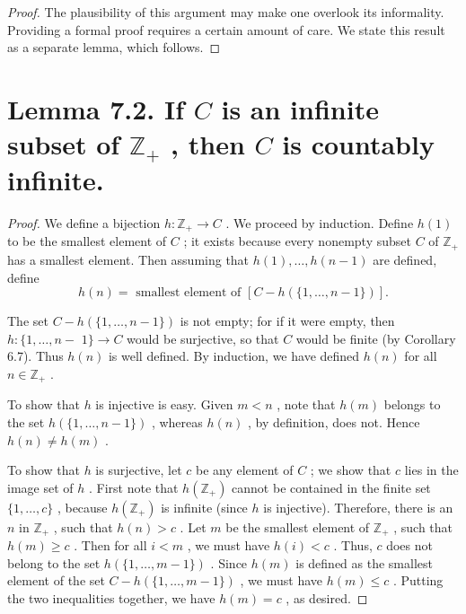 \begin{theorem}
\begin{proof}
The plausibility of this argument may make one overlook its informality. Providing a formal proof requires a certain amount of care. We state this result as a separate lemma, which follows.
\end{proof}
\section*{Lemma 7.2. If \(C\) is an infinite subset of \({\mathbb{Z}}_{ + }\) , then \(C\) is countably infinite.}

\begin{proof}We define a bijection \(h : {\mathbb{Z}}_{ + } \rightarrow  C\) . We proceed by induction. Define \(h\left( 1\right)\) to be the smallest element of \(C\) ; it exists because every nonempty subset \(C\) of \({\mathbb{Z}}_{ + }\) has a smallest element. Then assuming that \(h\left( 1\right) ,\ldots ,h\left( {n - 1}\right)\) are defined, define
\[
h\left( n\right)  = \text{ smallest element of }\left\lbrack  {C - h\left( {\{ 1,\ldots ,n - 1\} }\right) }\right\rbrack  .
\]

The set \(C - h\left( {\{ 1,\ldots ,n - 1\} }\right)\) is not empty; for if it were empty, then \(h : \{ 1,\ldots ,n -\)  \(1\}  \rightarrow  C\) would be surjective, so that \(C\) would be finite (by Corollary 6.7). Thus \(h\left( n\right)\) is well defined. By induction, we have defined \(h\left( n\right)\) for all \(n \in  {\mathbb{Z}}_{ + }\) .

To show that \(h\) is injective is easy. Given \(m < n\) , note that \(h\left( m\right)\) belongs to the set \(h\left( {\{ 1,\ldots ,n - 1\} }\right)\) , whereas \(h\left( n\right)\) , by definition, does not. Hence \(h\left( n\right)  \neq  h\left( m\right)\) .

To show that \(h\) is surjective, let \(c\) be any element of \(C\) ; we show that \(c\) lies in the image set of \(h\) . First note that \(h\left( {\mathbb{Z}}_{ + }\right)\) cannot be contained in the finite set \(\{ 1,\ldots ,c\}\) , because \(h\left( {\mathbb{Z}}_{ + }\right)\) is infinite (since \(h\) is injective). Therefore, there is an \(n\) in \({\mathbb{Z}}_{ + }\) , such that \(h\left( n\right)  > c\) . Let \(m\) be the smallest element of \({\mathbb{Z}}_{ + }\) , such that \(h\left( m\right)  \geq  c\) . Then for all \(i < m\) , we must have \(h\left( i\right)  < c\) . Thus, \(c\) does not belong to the set \(h\left( {\{ 1,\ldots ,m - 1\} }\right)\) . Since \(h\left( m\right)\) is defined as the smallest element of the set \(C - h\left( {\{ 1,\ldots ,m - 1\} }\right)\) , we must have \(h\left( m\right)  \leq  c\) . Putting the two inequalities together, we have \(h\left( m\right)  = c\) , as desired.


\end{proof}
\end{theorem}
